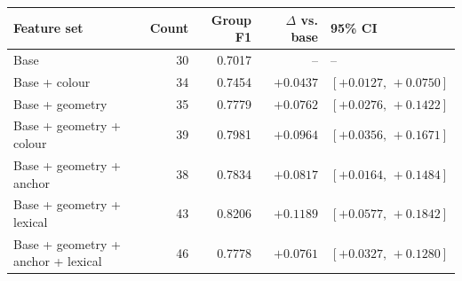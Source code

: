 \begin{tabular}{@{}lrrrl@{}}
\toprule
Feature set & Count & Group F1 & $\Delta$ vs. base & 95\% CI \\
\midrule
Base & 30 & 0.7017 & -- & -- \\
Base + colour & 34 & 0.7454 & $+0.0437$ & $[+0.0127,\,+0.0750]$ \\
Base + geometry & 35 & 0.7779 & $+0.0762$ & $[+0.0276,\,+0.1422]$ \\
Base + geometry + colour & 39 & 0.7981 & $+0.0964$ & $[+0.0356,\,+0.1671]$ \\
Base + geometry + anchor & 38 & 0.7834 & $+0.0817$ & $[+0.0164,\,+0.1484]$ \\
Base + geometry + lexical & 43 & 0.8206 & $+0.1189$ & $[+0.0577,\,+0.1842]$ \\
Base + geometry + anchor + lexical & 46 & 0.7778 & $+0.0761$ & $[+0.0327,\,+0.1280]$ \\
\bottomrule
\end{tabular}

